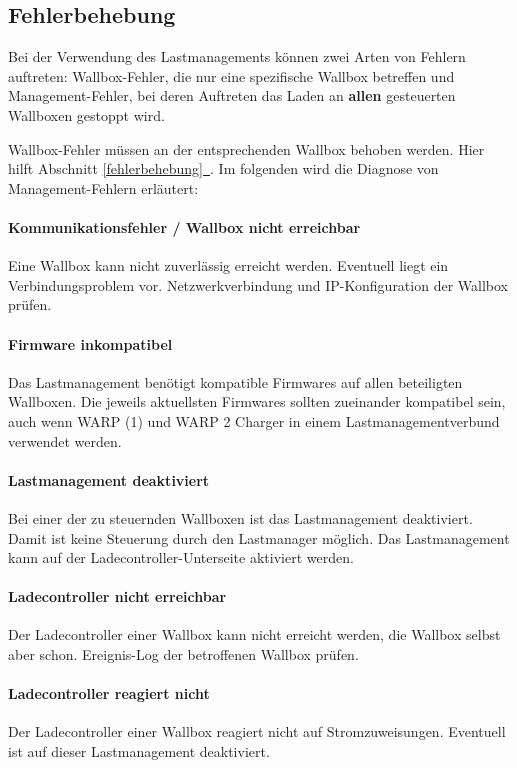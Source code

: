 \documentclass[a4paper,10pt]{article}
\newcommand*{\fullref}[1]{\hyperref[{#1}]{\ref*{#1}~\nameref*{#1}}}
\begin{document}
\begin{multicols*}{2}
	\subsection{Fehlerbehebung}
	Bei der Verwendung des Lastmanagements können zwei Arten von Fehlern auftreten: Wallbox-Fehler, die nur eine spezifische Wallbox betreffen und Management-Fehler,
	bei deren Auftreten das Laden an \textbf{allen} gesteuerten Wallboxen gestoppt wird.

	Wallbox-Fehler müssen an der entsprechenden Wallbox behoben werden. Hier hilft Abschnitt \fullref{fehlerbehebung}. Im folgenden wird die Diagnose von Management-Fehlern erläutert:

	\paragraph{Kommunikationsfehler / Wallbox nicht erreichbar}
	Eine Wallbox kann nicht zuverlässig erreicht werden. Eventuell liegt ein Verbindungsproblem vor. Netzwerkverbindung und IP-Konfiguration der Wallbox prüfen.

	\paragraph{Firmware inkompatibel}
	Das Lastmanagement benötigt kompatible Firmwares auf allen beteiligten Wallboxen. Die jeweils aktuellsten Firmwares sollten zueinander kompatibel sein,
	auch wenn WARP (1) und WARP 2 Charger in einem Lastmanagementverbund verwendet werden.

	\paragraph{Lastmanagement deaktiviert}
	Bei einer der zu steuernden Wallboxen ist das Lastmanagement deaktiviert. Damit ist keine Steuerung durch den Lastmanager möglich. Das Lastmanagement kann auf der Ladecontroller-Unterseite aktiviert werden.

	\paragraph{Ladecontroller nicht erreichbar}
	Der Ladecontroller einer Wallbox kann nicht erreicht werden, die Wallbox selbst aber schon. Ereignis-Log der betroffenen Wallbox prüfen.

	\paragraph{Ladecontroller reagiert nicht}
	Der Ladecontroller einer Wallbox reagiert nicht auf Stromzuweisungen. Eventuell ist auf dieser Lastmanagement deaktiviert.


\end{multicols*}
\end{document}
